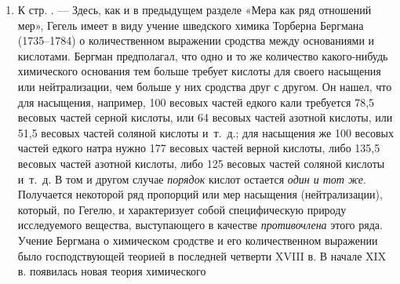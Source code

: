 \begin{enumerate}
эмпирического коэффициента, который в той или иной форме входит в уравнения
механики и физики. В качестве примера такой константы Гегель в следующей
фразе приводит величину $а$ в уравнении движения падения тел 
$s=at^2$. Гораздо чаще формулу движения падения тел
выражают уравнением $s=\frac 1 2 gt^2$, где константа
$g$ (постоянное для данного географического пункта ускорение силы
тяжести) равна приблизительно $9,8 \text{\em м}$ (в качестве единицы времени
берется при этом секунда). Следовательно, величина $а$ в уравнении
равна приблизительно $4,9 \text{\em м}$. Впрочем, надо сказать, что величина
$а$ или $g$, входящая в формулу движения падения тел, может
быть названа константою лишь в весьма относительном смысле. Дело в том, что
сама она изменяется с изменением расстояния от центра земного шара (а также
от расположения тяжелых масс на земной поверхности вблизи того места, где
производятся опыты с падением тел). Но так как эти изменения весьма
незначительны в тех случаях падения тел, которые рассматриваются в
элементарной механике (т.~е. в тех случаях, где расстояния, проходимые
падающим телом, незначительны по сравнению с длиной земного радиуса, причем
опыты производятся в одном и том же месте земной поверхности), то ими
вполне можно пренебречь.
\item \label{bkm:Ref474666676}К стр. \pageref{bkm:bm63}. — Здесь, как и в
предыдущем разделе «Мера как ряд отношений мер», Гегель имеет в виду учение
шведского химика Торберна Бергмана (1735–1784) о количественном выражении
сродства между основаниями и кислотами. Бергман предполагал, что одно и то
же количество какого-нибудь химического основания тем больше требует
кислоты для своего насыщения или нейтрализации, чем больше у них сродства
друг с другом. Он нашел, что для насыщения, например, 100 весовых частей
едкого кали требуется 78,5 весовых частей серной кислоты, или 64 весовых
частей азотной кислоты, или 51,5 весовых частей соляной кислоты и~т.~д.;
для насыщения же 100 весовых частей едкого натра нужно 177 весовых частей
верной кислоты, либо 135,5 весовых частей азотной кислоты, либо 125 весовых
частей соляной кислоты и~т.~д. В том и другом случае {\em порядок}
кислот остается {\em один и тот же}. Получается некоторой ряд пропорций
или мер насыщения (нейтрализации), который, по Гегелю, и характеризует
собой специфическую природу исследуемого вещества, выступающего в качестве
{\em противочлена} этого ряда. Учение Бергмана о химическом сродстве и
его количественном выражении было господствующей теорией в последней
четверти XVIII в. В начале XIX в. появилась новая теория химического

\end{enumerate}
